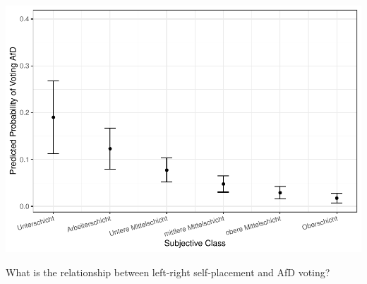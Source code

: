 \documentclass[
]{article}
\begin{document}
\includegraphics{AVCD_Final_Assignment-Edenhofer_files/figure-latex/afd-subjective-class-1.pdf}

What is the relationship between left-right self-placement and AfD
voting?
\end{document}

